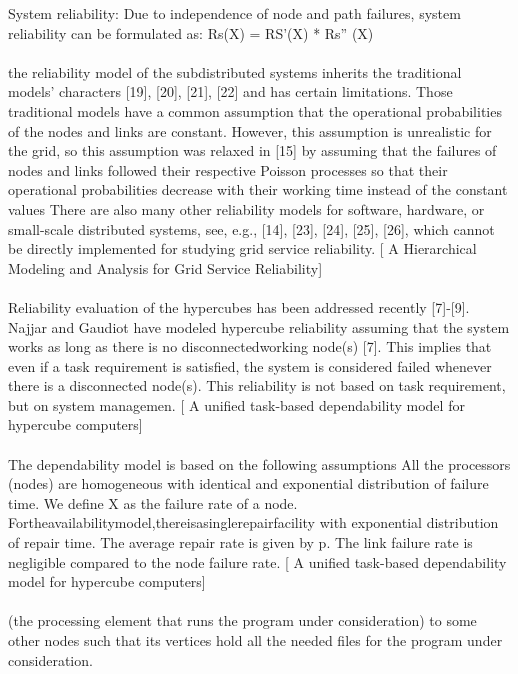 \documentclass{cslthse-msc}
\begin{document}
System reliability: Due to independence of node and path failures, system reliability can be formulated as: Rs(X) = RS’(X) * Rs” (X) \cite{optTaskAllocationForMaxRel}
\\\\
the reliability model of the subdistributed systems inherits the traditional models’ characters [19], [20], [21], [22] and has certain limitations. Those traditional models have a common assumption that the operational probabilities of the nodes and links are constant. However, this assumption is unrealistic for the grid, so this assumption was relaxed in [15] by assuming that the failures of nodes and links followed their respective Poisson processes so that their operational probabilities decrease with their working time instead of the constant values 
There are also many other reliability models for software, hardware, or small-scale distributed systems, see, e.g., [14], [23], [24], [25], [26], which cannot be directly implemented for studying grid service reliability. [ A Hierarchical Modeling and Analysis for Grid Service Reliability]
\\\\
Reliability evaluation of the hypercubes has been addressed recently [7]-[9]. Najjar and Gaudiot have modeled hypercube reliability assuming that the system works as long as there is no disconnectedworking node(s) [7]. This implies that even if a task requirement is satisfied, the system is considered failed whenever there is a disconnected node(s). This reliability is not based on task requirement, but on system managemen.  [ A unified task-based dependability model for hypercube computers]
\\\\
The dependability model is based on the following assumptions All the processors (nodes) are homogeneous with identical and exponential distribution of failure time. We define X as the failure rate of a node. Fortheavailabilitymodel,thereisasinglerepairfacility with exponential distribution of repair time. The average repair rate is given by p.
The link failure rate is negligible compared to the node failure rate. [ A unified task-based dependability model for hypercube computers]
\\\\
(the processing element that runs the program under consideration) to some other nodes such that its vertices hold all the needed files for the program under consideration. \cite{Reliability analysis of distributed systems based on a fast reliability algorithm}
\end{document}
